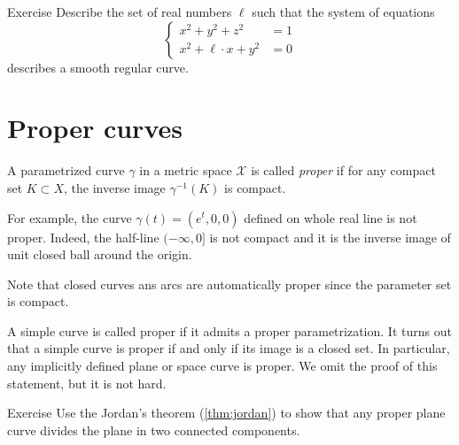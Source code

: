 \begin{thm}{Exercise}\label{ex:viviani}
Describe the set of real numbers $\ell$
such that the system of equations
\[\begin{cases}
x^2+y^2+z^2&=1
\\
x^2+\ell\cdot x+y^2&=0
\end{cases}\]
describes a smooth regular curve.
\end{thm}

\section{Proper curves}

A parametrized curve $\gamma$ in a metric space $\mathcal{X}$ is called \emph{proper} if for any compact set $K \subset X$, the inverse image $\gamma^{-1}(K)$ is compact.

For example, the curve $\gamma(t)=(e^t,0,0)$ defined on whole real line is not proper.
Indeed, the half-line $(-\infty,0]$ is not compact and it is the inverse image of unit closed ball around the origin.  

Note that closed curves ans arcs are automatically proper since the parameter set is compact.

A simple curve is called proper if it admits a proper parametrization.
It turns out that a simple curve is proper if and only if its image is a closed set.
In particular, any implicitly defined plane or space curve is proper.
We omit the proof of this statement, but it is not hard. %

\begin{thm}{Exercise}\label{ex:proper-curve}
Use the Jordan's theorem (\ref{thm:jordan}) to show that any proper plane curve divides the plane in two connected components.  
\end{thm}




